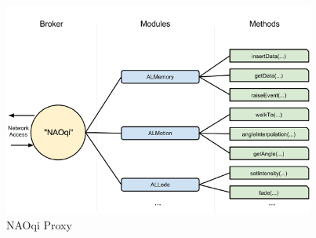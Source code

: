 \begin{figure}
	[h] \centering 
	\includegraphics[height=7cm]{figures/content/nao-proxy.png} 
	\caption{NAOqi Proxy}
	\label{fg:nao:proxy} 
\end{figure}